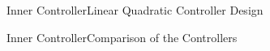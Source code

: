 \begin{frame}{Inner Controller}{Linear Quadratic Controller Design}
    
\end{frame}

\begin{frame}{Inner Controller}{Comparison of the Controllers}
    
\end{frame}